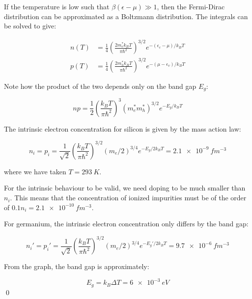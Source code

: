 \documentclass[12pt]{article}
\begin{document}
If the temperature is low such that $\beta(\epsilon - \mu) \gg 1$, then the Fermi-Dirac distribution can be approximated as a Boltzmann distribution. The integrals can be solved to give:

\begin{equation}
    \begin{split}
        n(T) &= \frac{1}{4} \left( \frac{2m_{e}^{*}k_{B}T}{\pi\hbar^{2}} \right)^{3/2} e^{-(\epsilon_{c} - \mu)/k_{B}T} \\
        p(T) &= \frac{1}{4} \left( \frac{2m_{h}^{*}k_{B}T}{\pi\hbar^{2}} \right)^{3/2} e^{-(\mu - \epsilon_{v})/k_{B}T}
    \end{split}
\end{equation}

Note how the product of the two depends only on the band gap $E_{g}$:

\begin{equation}
    np = \frac{1}{2} \left( \frac{k_{B}T}{\pi \hbar^{2}} \right)^{3} (m_{e}^{*}m_{h}^{*})^{3/2} e^{-E_{g}/k_{B}T}
\end{equation}

The intrinsic electron concentration for silicon is given by the mass action law:

\begin{equation}
    n_{i} = p_{i} = \frac{1}{\sqrt{2}} \left( \frac{k_{B}T}{\pi \hbar^{2}} \right)^{3/2} (m_{e}/2)^{3/4} e^{-E_{g}/2k_{B}T} = \qty{2.1e-9}{fm^{-3}}
\end{equation}

where we have taken $T = \qty{293}{K}$.

For the intrinsic behaviour to be valid, we need doping to be much smaller than $n_{i}$. This means that the concentration of ionized impurities must be of the order of $0.1n_{i} = \qty{2.1e-10}{fm^{-3}}$.

For germanium, the intrinsic electron concentration only differs by the band gap:

\begin{equation}
    n_{i}' = p_{i}' = \frac{1}{\sqrt{2}} \left( \frac{k_{B}T}{\pi \hbar^{2}} \right)^{3/2} (m_{e}/2)^{3/4} e^{-E_{g}'/2k_{B}T} = \qty{9.7e-6}{fm^{-3}}
\end{equation}

From the graph, the band gap is approximately:

\begin{equation}
    E_{g} = k_{B} \Delta T = \qty{6e-3}{eV}
\end{equation}
\qed
\end{document}
